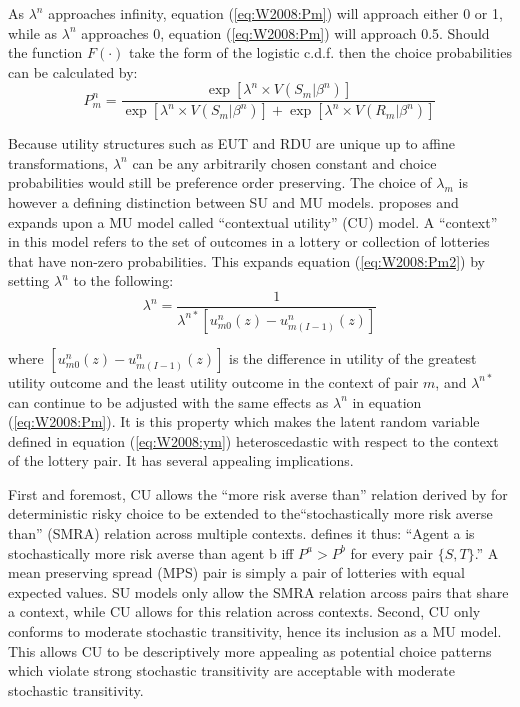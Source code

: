 \documentclass[../main.tex]{subfiles}
\begin{document}
As $\lambda^n$ approaches infinity, equation (\ref{eq:W2008:Pm}) will approach either 0 or 1, while as $\lambda^n$ approaches 0, equation (\ref{eq:W2008:Pm}) will approach 0.5.
Should the function $F(\cdot)$ take the form of the logistic c.d.f. then the choice probabilities can be calculated by:
\begin{equation}
	\label{eq:W2008:Pm2}
	P_m^n = \frac{\exp \left[ \lambda^n \times V(S_m | \beta^n) \right]}{  \exp \left[ \lambda^n \times V(S_m | \beta^n) \right] + \exp \left[ \lambda^n \times V(R_m | \beta^n) \right] }
\end{equation}

Because utility structures such as EUT and RDU are unique up to affine transformations, $\lambda^n$ can be any arbitrarily chosen constant and choice probabilities would still be preference order preserving.
The choice of $\lambda_m$ is however a defining distinction between SU and MU models.
\textcite{Wilcox2008} proposes and \textcite{Wilcox2011} expands upon a MU model called \enquote{contextual utility} (CU) model.
A \enquote{context} in this model refers to the set of outcomes in a lottery or collection of lotteries that have non-zero probabilities.
This expands equation (\ref{eq:W2008:Pm2}) by setting $\lambda^n$ to the following:
\begin{equation}
	\lambda^n = \frac{1}{\lambda^{n*} \left[ u^n_{m0}(z) - u^n_{m(I-1)}(z) \right]}
\end{equation}

\noindent where $\left[ u^n_{m0}(z) - u^n_{m(I-1)}(z) \right]$ is the difference in utility of the greatest utility outcome and the least utility outcome in the context of pair $m$, and $\lambda^{n*}$ can continue to be adjusted with the same effects as $\lambda^n$ in equation (\ref{eq:W2008:Pm}).
It is this property which makes the latent random variable defined in equation (\ref{eq:W2008:ym}) heteroscedastic with respect to the context of the lottery pair.
It has several appealing implications.

First and foremost, CU allows the \enquote{more risk averse than} relation derived by \textcite{Pratt1964} for deterministic risky choice to be extended to the\enquote{stochastically more risk averse than} (SMRA) relation across multiple contexts.
\textcite[89]{Wilcox2011} defines it thus: \enquote{Agent a is stochastically more risk averse than agent b \textelp{} iff $P^a > P^b$ for every  pair $\lbrace S, T \rbrace$.}
A mean preserving spread (MPS) pair is simply a pair of lotteries with equal expected values.
SU models only allow the SMRA relation arcoss pairs that share a context, while CU allows for this relation across contexts.
Second, CU only conforms to moderate stochastic transitivity, hence its inclusion as a MU model.
This allows CU to be descriptively more appealing as potential choice patterns which violate strong stochastic transitivity are acceptable with moderate stochastic transitivity.
\end{document}

